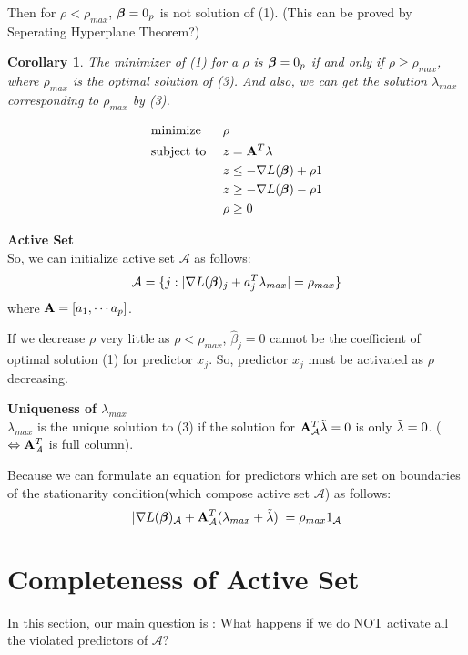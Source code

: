 \documentclass{article}
\newcommand{\bA}{{\bf A}}
\newcommand{\bbeta}{\mbox{\boldmath{$\beta$}}}
\newcommand{\bea}{\begin{eqnarray}}
\newcommand{\eea}{\end{eqnarray}}
\newtheorem{corollary}{\bf Corollary}
\begin{document}
Then for $\rho < \rho_{max}$, $\bbeta = 0_p$ is not solution of (1). (This can be proved by Seperating Hyperplane Theorem?)

\begin{corollary}
The minimizer of (1) for a $\rho$ is $\bbeta = 0_p$ if and only if $\rho \geq \rho_{max}$, where $\rho_{max}$ is the optimal solution of (3).
And also, we can get the solution $\lambda_{max}$ corresponding to $\rho_{max}$ by (3).
\end{corollary}

\bea
\begin{aligned}
    &\text{minimize} && \rho \\
    &\text{subject to } && z = \bA^T \lambda \\
    & && z \leq -\nabla L(\bbeta) + \rho 1 \\
    & && z \geq -\nabla L(\bbeta) - \rho 1 \\
    & && \rho \geq 0
\end{aligned}
\eea

\textbf{Active Set} \\
So, we can initialize active set $\mathcal{A}$ as follows:
$$\mathcal{A} = \{j : \lvert \nabla L(\bbeta)_j + a_j^T \lambda_{max} \rvert = \rho_{max}\}$$
where $\bA = [a_1, \cdots a_p]$.

If we decrease $\rho$ very little as $\rho < \rho_{max}$, $\hat \beta_j = 0$ cannot be the coefficient of optimal solution (1) for predictor $x_j$.
So, predictor $x_j$ must be activated as $\rho$ decreasing.

\bigskip
\textbf{Uniqueness of $\lambda_{max}$} \\
$\lambda_{max}$ is the unique solution to (3) if the solution for $\bA_{\mathcal{A}}^T \Tilde{\lambda} = 0$ is only $\Tilde{\lambda} = 0$. ($\Leftrightarrow \bA_{\mathcal{A}}^T$ is full column).

Because we can formulate an equation for predictors which are set on boundaries of the stationarity condition(which compose active set $\mathcal{A}$) as follows:
$$\lvert \nabla L(\bbeta)_{\mathcal{A}} + \bA_{\mathcal{A}}^T (\lambda_{max} + \Tilde{\lambda}) \rvert = \rho_{max} 1_{\mathcal{A}}$$

\section{Completeness of Active Set}
In this section, our main question is : What happens if we do NOT activate all the violated predictors of $\mathcal{A}$?
\end{document}
